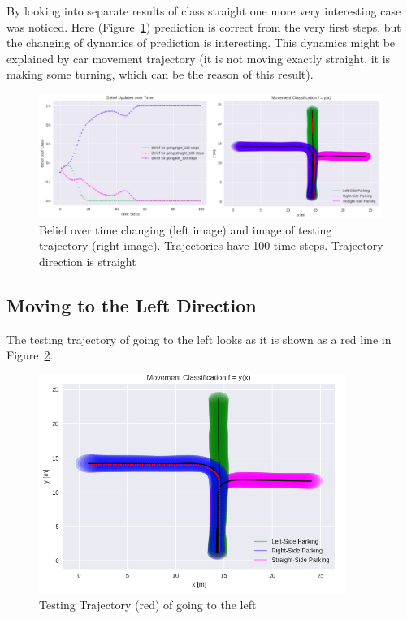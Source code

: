 By looking into separate results of class straight one more very interesting case was noticed. Here (Figure~\ref{fig:InterestingGood}) prediction is correct from the very first steps, but the changing of dynamics of prediction is interesting.  This dynamics might be explained by car movement trajectory (it is not moving exactly straight, it is making some turning, which can be the reason of this result).

\begin{figure}[h]
	\centering  	
	\includegraphics[width=15cm]{img/interesting_straight_tr.jpg}
	\caption{Belief over time changing (left image) and image of testing trajectory (right image). Trajectories have 100 time steps. Trajectory direction is straight}
	\label{fig:InterestingGood}    
\end{figure}

\subsection{Moving to the Left Direction}

The testing trajectory of going to the left looks as it is shown as a red line in Figure~\ref{fig:left}.

\begin{figure}[h]
	\centering  	
	\includegraphics[width=10cm]{img/left_org.jpg}
	\caption{Testing Trajectory (red) of going to the left}
	\label{fig:left}    
\end{figure}

